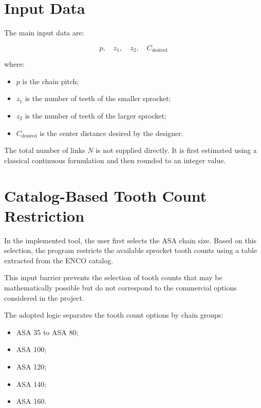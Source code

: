 \documentclass[12pt,a4paper]{article}
\begin{document}
\section{Input Data}

The main input data are:

\begin{equation}
p,\quad z_1,\quad z_2,\quad C_{\text{desired}}
\end{equation}

where:

\begin{itemize}
    \item $p$ is the chain pitch;
    \item $z_1$ is the number of teeth of the smaller sprocket;
    \item $z_2$ is the number of teeth of the larger sprocket;
    \item $C_{\text{desired}}$ is the center distance desired by the designer.
\end{itemize}

The total number of links $N$ is not supplied directly. It is first estimated using a classical continuous formulation and then rounded to an integer value.

\section{Catalog-Based Tooth Count Restriction}

In the implemented tool, the user first selects the ASA chain size. Based on this selection, the program restricts the available sprocket tooth counts using a table extracted from the ENCO catalog.

This input barrier prevents the selection of tooth counts that may be mathematically possible but do not correspond to the commercial options considered in the project.

The adopted logic separates the tooth count options by chain groups:

\begin{itemize}
    \item ASA 35 to ASA 80;
    \item ASA 100;
    \item ASA 120;
    \item ASA 140;
    \item ASA 160.
\end{itemize}
\end{document}
